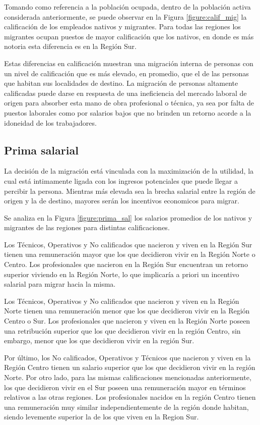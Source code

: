 \documentclass[12pt,a4paper]{article}
\begin{document}
Tomando como referencia a la población ocupada, dentro de la población activa considerada anteriormente, se puede observar en la Figura \ref{figure:calif_mig} la calificación de los empleados nativos y migrantes. Para todas las regiones los migrantes ocupan puestos de mayor calificación que los nativos, en donde es más notoria esta diferencia es en la Región Sur.

Estas diferencias en calificación muestran una migración interna de personas con un nivel de calificación que es más elevado, en promedio, que el de las personas que habitan sus localidades de destino. La migración de personas altamente calificadas puede darse en respuesta de una ineficiencia del mercado laboral de origen para absorber esta mano de obra profesional o técnica, ya sea por falta de puestos laborales como por salarios bajos que no brinden un retorno acorde a la idoneidad de los trabajadores.

\subsection{Prima salarial}
La decisión de la migración está vinculada con la maximización de la utilidad, la cual está intimamente ligada con los ingresos potenciales que puede llegar a percibir la persona. Mientras más elevada sea la brecha salarial entre la región de origen y la de destino, mayores serán los incentivos economicos para migrar.

Se analiza en la Figura \ref{figure:prima_sal} los salarios promedios de los nativos y migrantes de las regiones para distintas calificaciones. 

Los Técnicos, Operativos y No calificados que nacieron y viven en la Región Sur tienen una remuneración mayor que los que decidieron vivir en la Región Norte o Centro. Los profesionales que nacieron en la Región Sur encuentran un retorno superior viviendo en la Región Norte, lo que implicaría a priori un incentivo salarial para migrar hacia la misma.

Los Técnicos, Operativos y No calificados que nacieron y viven en la Región Norte tienen una remuneración menor que los que decidieron vivir en la Región Centro o Sur. Los profesionales que nacieron y viven en la Región Norte poseen una retribución superior que los que decidieron vivir en la región Centro, sin embargo, menor que los que decidieron vivir en la región Sur.

Por último, los No calificados, Operativos y Técnicos que nacieron y viven en la Región Centro tienen un salario superior que los que decidieron vivir en la región Norte. Por otro lado, para las mismas calificaciones mencionadas anteriormente, los que decidieron vivir en el Sur poseen una remuneración mayor en términos relativos a las otras regiones. Los profesionales nacidos en la región Centro tienen una remuneración muy similar independientemente de la región donde habitan, siendo levemente superior la de los que viven en la Region Sur.
\end{document}
